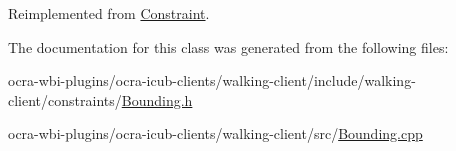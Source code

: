 \-Reimplemented from \hyperlink{classConstraint_a07453509c3f0f95034db965c9e699810}{\-Constraint}.



\-The documentation for this class was generated from the following files\-:\begin{DoxyCompactItemize}
\item 
ocra-\/wbi-\/plugins/ocra-\/icub-\/clients/walking-\/client/include/walking-\/client/constraints/\hyperlink{Bounding_8h}{\-Bounding.\-h}\item 
ocra-\/wbi-\/plugins/ocra-\/icub-\/clients/walking-\/client/src/\hyperlink{Bounding_8cpp}{\-Bounding.\-cpp}\end{DoxyCompactItemize}
